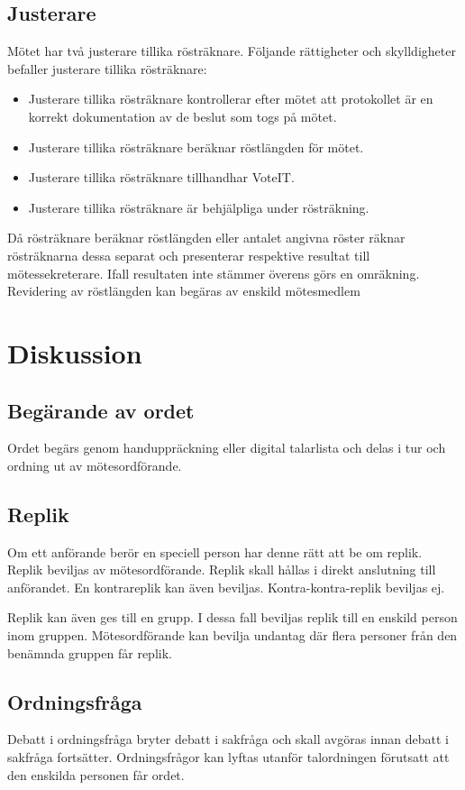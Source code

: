 \documentclass[11pt, includeaddress]{classes/cthit}
\begin{document}
\subsection{Justerare}
Mötet har två justerare tillika rösträknare. Följande rättigheter och skylldigheter befaller justerare tillika rösträknare:
\begin{itemize}
    \item Justerare tillika rösträknare kontrollerar efter mötet att protokollet är en korrekt dokumentation av de beslut som togs på mötet.
    \item Justerare tillika rösträknare beräknar röstlängden för mötet.
    \item Justerare tillika rösträknare tillhandhar VoteIT.
    \item Justerare tillika rösträknare är behjälpliga under rösträkning.
\end{itemize}
Då rösträknare beräknar röstlängden eller antalet angivna röster räknar rösträknarna dessa separat och presenterar respektive resultat till mötessekreterare.
Ifall resultaten inte stämmer överens görs en omräkning.
Revidering av röstlängden kan begäras av enskild mötesmedlem
\section{Diskussion}
\subsection{Begärande av ordet}
Ordet begärs genom handuppräckning eller digital talarlista och delas
i tur och ordning ut av mötesordförande.
\subsection{Replik}
Om ett anförande berör en speciell person har denne rätt att be om replik.
Replik beviljas av mötesordförande.
Replik skall hållas i direkt anslutning till anförandet.
En kontrareplik kan även beviljas.
Kontra-kontra-replik beviljas ej.

Replik kan även ges till en grupp. I dessa fall beviljas replik till en enskild person inom gruppen.
Mötesordförande kan bevilja undantag där flera personer från den benämnda gruppen får replik.

\subsection{Ordningsfråga}
Debatt i ordningsfråga bryter debatt i sakfråga och skall avgöras innan debatt i sakfråga fortsätter.
Ordningsfrågor kan lyftas utanför talordningen förutsatt att den enskilda personen får ordet.
\end{document}
